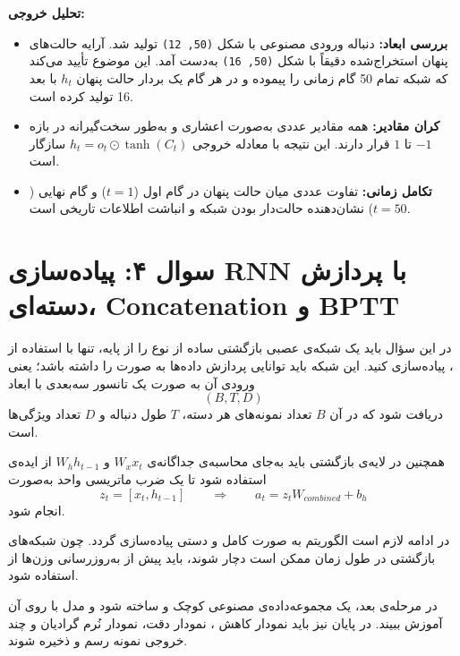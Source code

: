 \documentclass[12pt,a4paper]{article}
\begin{document}
\begin{tcolorbox}[colback=softorange,colframe=golden,title=\textbf{کد آزمایش و نتایج}]
		\textbf{تحلیل خروجی:}
		\begin{itemize}
			\item \textbf{بررسی ابعاد:} دنباله ورودی مصنوعی با شکل \texttt{(50, 12)} تولید شد. آرایه حالت‌های پنهان استخراج‌شده دقیقاً با شکل \texttt{(50, 16)} به‌دست آمد. این موضوع تأیید می‌کند که شبکه تمام 50 گام زمانی را پیموده و در هر گام یک بردار حالت پنهان $h_t$ با بعد 16 تولید کرده است.
			\item \textbf{کران مقادیر:} همه مقادیر عددی به‌صورت اعشاری و به‌طور سخت‌گیرانه در بازه $-1$ تا $1$ قرار دارند. این نتیجه با معادله خروجی $h_t = o_t \odot \tanh(C_t)$ سازگار است.
			\item \textbf{تکامل زمانی:} تفاوت عددی میان حالت پنهان در گام اول ($t=1$) و گام نهایی ($t=50$) نشان‌دهنده حالت‌دار بودن شبکه و انباشت اطلاعات تاریخی است.
		\end{itemize}
	\end{tcolorbox}
	

\section{سوال ۴: پیاده‌سازی RNN با پردازش دسته‌ای، Concatenation و BPTT}

\begin{tcolorbox}[
	colback=lightblue,
	colframe=mainblue,
	title={متن کامل صورت مسئله},
	fonttitle=\bfseries
	]
	
	در این سؤال باید یک شبکه‌ی عصبی بازگشتی ساده از نوع  را از پایه،
	تنها با استفاده از ، پیاده‌سازی کنید. این شبکه باید توانایی پردازش داده‌ها
	به صورت  را داشته باشد؛ یعنی ورودی آن به صورت یک تانسور سه‌بعدی با ابعاد
	\[
	(B, T, D)
	\]
	دریافت شود که در آن \(B\) تعداد نمونه‌های هر دسته، \(T\) طول دنباله و \(D\) تعداد ویژگی‌ها است.
	
	همچنین در لایه‌ی بازگشتی باید به‌جای محاسبه‌ی جداگانه‌ی
	\(
	W_x x_t
	\)
	و
	\(
	W_h h_{t-1}
	\)
	از ایده‌ی  استفاده شود تا یک ضرب ماتریسی واحد به‌صورت
	\[
	z_t = [x_t, h_{t-1}]
	\qquad \Rightarrow \qquad
	a_t = z_t W_{combined} + b_h
	\]
	انجام شود.
	
	در ادامه لازم است الگوریتم  به صورت کامل
	و دستی پیاده‌سازی گردد. چون شبکه‌های بازگشتی در طول زمان ممکن است دچار
	 شوند، باید پیش از به‌روزرسانی وزن‌ها از
	 استفاده شود.
	
	در مرحله‌ی بعد، یک مجموعه‌داده‌ی مصنوعی کوچک و  ساخته شود و
	مدل با  روی آن آموزش ببیند. در پایان نیز باید نمودار کاهش
	، نمودار دقت، نمودار نُرم گرادیان و چند خروجی نمونه
	رسم و ذخیره شوند.
\end{tcolorbox}
\end{document}
